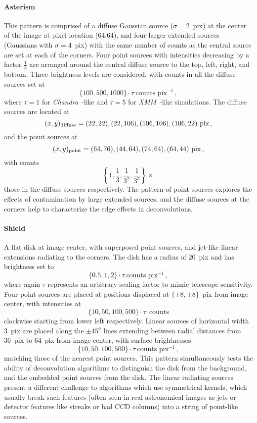 \documentclass[twocolumn]{aastex631}
\newcommand{\chandra}{\textit{Chandra}~}
\newcommand{\xmm}{\textit{XMM}~}
\begin{document}
    \paragraph{Asterism} This pattern is comprised of a diffuse Gaussian source ($\sigma=2$~pix) at the center of the image at pixel location (64,64), and four larger extended sources (Gaussians with $\sigma=4$~pix) with the same number of counts as the central source are set at each of the corners.  Four point sources with intensities decreasing by a factor $\frac{1}{3}$ are arranged around the central diffuse source to the top, left, right, and bottom.  Three brightness levels are considered, with counts in all the diffuse sources set at 
    $$\{100, 500, 1000\} \cdot \tau ~\textrm{counts~pix}^{-1}\,,$$
    where $\tau=1$ for \chandra-like and $\tau=5$ for \xmm-like simulations.  The diffuse sources are located at
    $$(x,y)_{{\rm diffuse}} = (22,22), (22,106), (106,106), (106,22) ~\textrm{pix} \,,$$
    and the point sources at
    $$(x,y)_{{\rm point}} = (64,76), (44,64), (74,64), (64,44) ~\textrm{pix}\,,$$
    with counts
    $$\left\{1, \frac{1}{3}, \frac{1}{3^2}, \frac{1}{3^3} \right\} \times$$
    those in the diffuse sources respectively.  The pattern of point sources explores the effects of contamination by large extended sources, and the diffuse sources at the corners help to characterize the edge effects in deconvolutions.
    
    \paragraph{Shield} A flat disk at image center, with superposed point sources, and jet-like linear extensions radiating to the corners.  The disk has a radius of 20~pix and has brightness set to
    $$\{0.5, 1, 2\} \cdot \tau ~\textrm{counts~pix}^{-1} \,,$$
    where again $\tau$ represents an arbitrary scaling factor to mimic telescope sensitivity.  Four point sources are placed at positions displaced at $\{\pm8,\pm8\}$~pix from image center, with intensities at
    $$\{10, 50, 100, 500\} \cdot \tau ~~\textrm{counts}$$
    clockwise starting from lower left respectively.  Linear sources of horizontal width 3~pix are placed along the $\pm45^o$ lines extending between radial distances from 36~pix to 64~pix from image center, with surface brightnesses
    $$\{10, 50, 100, 500\} \cdot \tau ~\textrm{counts~pix}^{-1} \,,$$
    matching those of the nearest point sources.  This pattern simultaneously tests the ability of deconvolution algorithms to distinguish the disk from the background, and the embedded point sources from the disk.  The linear radiating sources present a different challenge to algorithms which use symmetrical kernels, which usually break such features (often seen in real astronomical images as jets or detector features like streaks or bad CCD columns) into a string of point-like sources.
\end{document}
